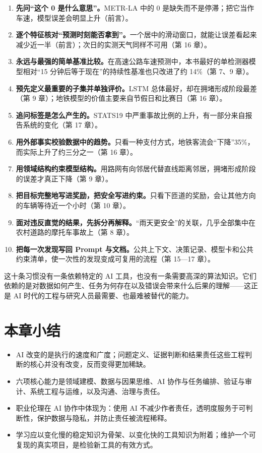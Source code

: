 \begin{enumerate}
  \item \textbf{先问“这个 0 是什么意思”。}METR-LA 中的 0 是缺失而不是停滞；把它当作车速，模型误差会明显上升（前言）。
  \item \textbf{逐个特征核对“预测时刻能否拿到”。}一个居中的滑动窗口，就能让误差看起来减少近一半（前言）；次日的实测天气同样不可用（第 16 章）。
  \item \textbf{永远与最强的简单基准比较。}在高速公路车速预测中，本书最好的单检测器模型相对“15 分钟后等于现在”的持续性基准也只改进了约 14\%（第 7、9 章）。
  \item \textbf{预先定义最重要的子集并单独评价。}LSTM 总体最好，却在拥堵形成阶段最差（第 9 章）；地铁模型的价值主要来自节假日和比赛日（第 16 章）。
  \item \textbf{追问标签是怎么产生的。}STATS19 中严重事故比例的上升，有一部分来自报告系统的变化（第 17 章）。
  \item \textbf{用外部事实校验数据中的趋势。}只看一种支付方式，地铁客流会“下降”35\%，而实际上升了约三分之一（第 16 章）。
  \item \textbf{用领域结构约束模型结构。}用路网有向邻居代替直线距离邻居，拥堵形成阶段的误差才真正下降（第 9 章）。
  \item \textbf{把目标完整地写进奖励，把安全写进约束。}只看下匝道的奖励，会让其他方向的车辆等待近一个小时（第 10 章）。
  \item \textbf{面对违反直觉的结果，先拆分再解释。}“雨天更安全”的关联，几乎全部集中在农村道路的摩托车事故上（第 8 章）。
  \item \textbf{把每一次发现写回 Prompt 与文档。}公共上下文、决策记录、模型卡和公共约束清单，使一次性的发现变成可复用的流程（第 15—17 章）。
\end{enumerate}

这十条习惯没有一条依赖特定的 AI 工具，也没有一条需要高深的算法知识。它们依赖的是对数据如何产生、任务为何存在以及错误会带来什么后果的理解——这正是 AI 时代的工程与研究人员最需要、也最难被替代的能力。

\section{本章小结}

\begin{itemize}
  \item AI 改变的是执行的速度和广度；问题定义、证据判断和结果责任这些工程判断的核心并没有改变，反而变得更加稀缺。
  \item 六项核心能力是领域建模、数据与因果思维、AI 协作与任务编排、验证与审计、系统工程与运维，以及沟通、治理与责任。
  \item 职业伦理在 AI 协作中体现为：使用 AI 不减少作者责任，透明度服务于可判断性，保护数据与隐私，并防止责任被流程稀释。
  \item 学习应以变化慢的稳定知识为骨架、以变化快的工具知识为附着；维护一个可复现的真实项目，是检验新工具的有效方式。
\end{itemize}

